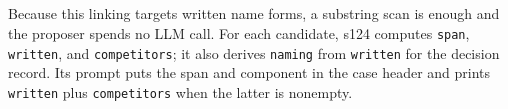 
\subsection{\linkerN}\label{sec:name-linker}


Because this linking targets written name forms, a substring scan is enough and the proposer spends no \ac{LLM} call.
For each candidate, s124 computes \texttt{span}, \texttt{written}, and \texttt{competitors}; it also derives \texttt{naming} from \texttt{written} for the decision record.
Its prompt puts the span and component in the case header and prints \texttt{written} plus \texttt{competitors} when the latter is nonempty.

